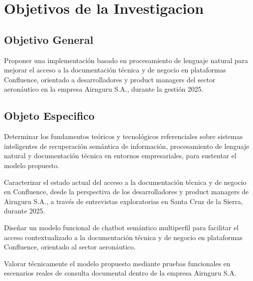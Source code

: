 \chapter{Objetivos de la Investigacion}

\section{Objetivo General}
Proponer una implementación basado en procesamiento de lenguaje natural para mejorar el acceso a la documentación técnica y de negocio en plataformas Confluence, orientado a desarrolladores y product managers del sector aeronáutico en la empresa Airnguru S.A., durante la gestión 2025.

\section{Objeto Especifico}
Determinar los fundamentos teóricos y tecnológicos referenciales sobre sistemas inteligentes de recuperación semántica de información, procesamiento de lenguaje natural y documentación técnica en entornos empresariales, para sustentar el modelo propuesto.

Caracterizar el estado actual del acceso a la documentación técnica y de negocio en Confluence, desde la perspectiva de los desarrolladores y product managers de Airnguru S.A., a través de entrevistas exploratorias en Santa Cruz de la Sierra, durante 2025.

Diseñar un modelo funcional de chatbot semántico multiperfil para facilitar el acceso contextualizado a la documentación técnica y de negocio en plataformas Confluence, orientado al sector aeronáutico.

Valorar técnicamente el modelo propuesto mediante pruebas funcionales en escenarios reales de consulta documental dentro de la empresa Airnguru S.A.


